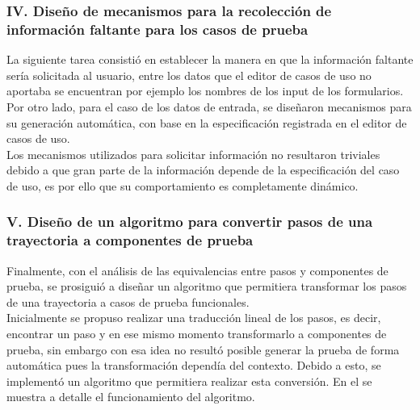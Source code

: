 	
	\subsubsection{IV. Diseño de mecanismos para la recolección de información faltante para los casos de prueba}

	La siguiente tarea consistió en establecer la manera en que la información faltante sería solicitada al usuario, entre los datos que el editor de casos de uso no aportaba se encuentran por ejemplo los nombres de los input de los formularios. Por otro lado, para el caso de los datos de entrada, se diseñaron mecanismos para su generación automática, con base en la especificación registrada en el editor de casos de uso.\\
	 
	 Los mecanismos utilizados para solicitar información no resultaron triviales debido a que gran parte de la información depende de la especificación del caso de uso, es por ello que su comportamiento es completamente dinámico.
	

	\subsubsection{V. Diseño de un algoritmo para convertir pasos de una trayectoria a componentes de prueba}
	
	Finalmente, con el análisis de las equivalencias entre pasos y componentes de prueba, se prosiguió a diseñar un algoritmo que permitiera transformar los pasos de una trayectoria a casos de prueba funcionales.\\
	
	Inicialmente se propuso realizar una traducción lineal de los pasos, es decir, encontrar un paso y en ese mismo momento transformarlo a componentes de prueba, sin embargo con esa idea no resultó posible generar la prueba de forma automática pues la transformación dependía del contexto. Debido a esto, se implementó un algoritmo que permitiera realizar esta conversión. En el  se muestra a detalle el funcionamiento del algoritmo. 
	